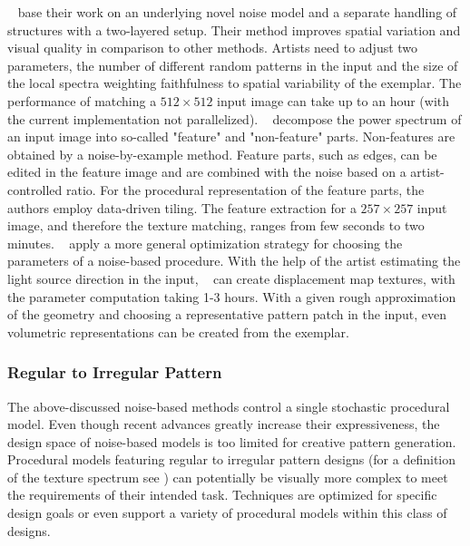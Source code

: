 \citeauthor*{guingo_2017_btm}~\cite{guingo_2017_btm} base their work on an underlying novel noise model and a separate handling of structures with a two-layered setup. Their method improves spatial variation and visual quality in comparison to other methods. Artists need to adjust two parameters, the number of different random patterns in the input and the size of the local spectra weighting faithfulness to spatial variability of the exemplar. The performance of matching a $512\times512$ input image can take up to an hour (with the current implementation not parallelized). \citeauthor*{kang_2017_fpt}~\cite{kang_2017_fpt} decompose the power spectrum of an input image into so-called "feature" and "non-feature" parts. Non-features are obtained by a noise-by-example method. Feature parts, such as edges, can be edited in the feature image and are combined with the noise based on a artist-controlled ratio. For the procedural representation of the feature parts, the authors employ data-driven tiling. The feature extraction for a $257\times257$ input image, and therefore the texture matching, ranges from few seconds to two minutes. \citeauthor*{gilet_2010_ias}~\cite{gilet_2010_ias} apply a more general optimization strategy for choosing the parameters of a noise-based procedure. With the help of the artist estimating the light source direction in the input, \citeauthor*{gilet_2010_ias}~\cite{gilet_2010_ias} can create displacement map textures, with the parameter computation taking 1-3 hours. With a given rough approximation of the geometry and choosing a representative pattern patch in the input, even volumetric representations can be created from the exemplar.

\subsubsection{Regular to Irregular Pattern}
\label{subsubsec:analysis_distribution_and_repetition_regular}

The above-discussed noise-based methods control a single stochastic procedural model. Even though recent advances greatly increase their expressiveness, the design space of noise-based models is too limited for creative pattern generation. Procedural models featuring regular to irregular pattern designs (for a definition of the texture spectrum see \cite{lin_2006_qeo}) can potentially be visually more complex to meet the requirements of their intended task. Techniques are optimized for specific design goals or even support a variety of procedural models within this class of designs.

